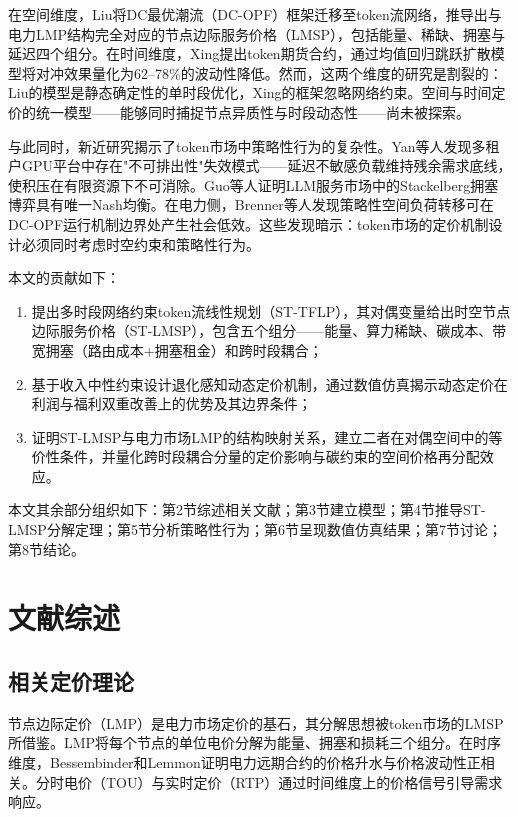 \documentclass[11pt,a4paper,twocolumn]{article}
\begin{document}
在空间维度，Liu\cite{liu2026locational}将DC最优潮流（DC-OPF）框架迁移至token流网络，推导出与电力LMP结构完全对应的节点边际服务价格（LMSP），包括能量、稀缺、拥塞与延迟四个组分。在时间维度，Xing\cite{xing2026tokenfutures}提出token期货合约，通过均值回归跳跃扩散模型将对冲效果量化为62--78\%的波动性降低。然而，这两个维度的研究是割裂的：Liu的模型是静态确定性的单时段优化，Xing的框架忽略网络约束。空间与时间定价的统一模型——能够同时捕捉节点异质性与时段动态性——尚未被探索。

与此同时，新近研究揭示了token市场中策略性行为的复杂性。Yan等人\cite{yan2026stackelberg}发现多租户GPU平台中存在"不可排出性"失效模式——延迟不敏感负载维持残余需求底线，使积压在有限资源下不可消除。Guo等人\cite{guo2025prilm}证明LLM服务市场中的Stackelberg拥塞博弈具有唯一Nash均衡。在电力侧，Brenner等人\cite{brenner2026spatial}发现策略性空间负荷转移可在DC-OPF运行机制边界处产生社会低效。这些发现暗示：token市场的定价机制设计必须同时考虑时空约束和策略性行为。

本文的贡献如下：

\begin{enumerate}[leftmargin=*]
\item 提出多时段网络约束token流线性规划（ST-TFLP），其对偶变量给出时空节点边际服务价格（ST-LMSP），包含五个组分——能量、算力稀缺、碳成本、带宽拥塞（路由成本+拥塞租金）和跨时段耦合；
\item 基于收入中性约束设计退化感知动态定价机制，通过数值仿真揭示动态定价在利润与福利双重改善上的优势及其边界条件；
\item 证明ST-LMSP与电力市场LMP的结构映射关系，建立二者在对偶空间中的等价性条件，并量化跨时段耦合分量的定价影响与碳约束的空间价格再分配效应。
\end{enumerate}

本文其余部分组织如下：第2节综述相关文献；第3节建立模型；第4节推导ST-LMSP分解定理；第5节分析策略性行为；第6节呈现数值仿真结果；第7节讨论；第8节结论。

\section{文献综述}

\subsection{相关定价理论}

节点边际定价（LMP）是电力市场定价的基石\cite{schweppe1988spot,hogan1992contract}，其分解思想被token市场的LMSP所借鉴。LMP将每个节点的单位电价分解为能量、拥塞和损耗三个组分\cite{stofft2002power}。在时序维度，Bessembinder和Lemmon\cite{bessembinder2002equilibrium}证明电力远期合约的价格升水与价格波动性正相关。分时电价（TOU）与实时定价（RTP）通过时间维度上的价格信号引导需求响应\cite{vazquez2019reinforcement}。
\end{document}
